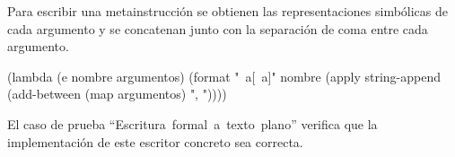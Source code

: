 \documentclass[letterpaper, twoside, openright, 11pt]{book}%
\begin{document}
Para escribir una metainstrucción se obtienen las representaciones simbólicas de cada argumento y se concatenan junto con la separación de coma entre cada argumento.

\nwenddocs{}\endmoddef\nwstartdeflinemarkup{}\nwenddeflinemarkup
(lambda (e nombre argumentos)
  (format "~a[~a]" nombre
          (apply string-append
                 (add-between (map  argumentos)
                              ", "))))
\nwendcode{}\nwdocspar

El caso de prueba ``{\Tt{}Escritura\ formal\ a\ texto\ plano\nwendquote}'' verifica que la implementación de este escritor concreto sea correcta.
\end{document}
